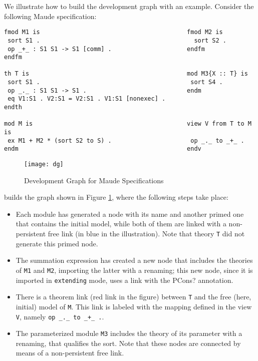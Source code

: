 We illustrate how to build the development graph with an example. Consider
the following Maude specification:

{\codesize
\begin{verbatim}
fmod M1 is                                         fmod M2 is
 sort S1 .                                           sort S2 .
 op _+_ : S1 S1 -> S1 [comm] .                     endfm
endfm

th T is                                            mod M3{X :: T} is
 sort S1 .                                          sort S4 .
 op _._ : S1 S1 -> S1 .                            endm
 eq V1:S1 . V2:S1 = V2:S1 . V1:S1 [nonexec] . 
endth

mod M is                                           view V from T to M is
 ex M1 + M2 * (sort S2 to S) .                      op _._ to _+_ .
endm                                               endv
\end{verbatim}
}

\begin{figure}[t]
\begin{center}
\texttt{[image: dg]}
\caption{Development Graph for Maude Specifications\label{fig:dg}}
\end{center}
\end{figure}

\noindent \Hets builds the graph shown in Figure \ref{fig:dg},
where the following steps take place:
\begin{itemize}
\item
Each module has generated a node with its name and
another primed one that contains the initial model, while both of them
are linked with a non-persistent free link (in blue in the illustration). Note that
theory \verb"T" did not generate this primed node.

\item
The summation expression has created a new node that includes the theories
of \verb"M1" and \verb"M2", importing the latter with a renaming; this new
node, since it is imported in \verb"extending" mode, uses a link with the
\textsf{PCons?} annotation.

\item
There is a theorem link (red link in the figure) between \verb"T" and the
free (here, initial) model of
\verb"M". This link is labeled with the mapping defined in the view \verb"V",
namely \verb"op _._ to _+_ .".

\item
The parameterized module \verb"M3" includes the theory of its parameter
with a renaming, that qualifies the sort. Note that these nodes are connected
by means of a non-persistent free link.
\end{itemize}

